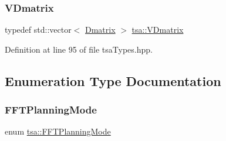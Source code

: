 \subsubsection{\texorpdfstring{V\+Dmatrix}{VDmatrix}}
{\footnotesize\ttfamily typedef std\+::vector$<$ \hyperlink{namespacetsa_ad260cd21c1891c4ed391fe788569aba4}{Dmatrix} $>$ \hyperlink{namespacetsa_a6dd7105c3202ef00a213d7c029f5b248}{tsa\+::\+V\+Dmatrix}}



Definition at line 95 of file tsa\+Types.\+hpp.



\subsection{Enumeration Type Documentation}
\mbox{\label{namespacetsa_a217e07ef78939f88b22c8428ac96b1ae}} 
\subsubsection{\texorpdfstring{F\+F\+T\+Planning\+Mode}{FFTPlanningMode}}
{\footnotesize\ttfamily enum \hyperlink{namespacetsa_a217e07ef78939f88b22c8428ac96b1ae}{tsa\+::\+F\+F\+T\+Planning\+Mode}}

